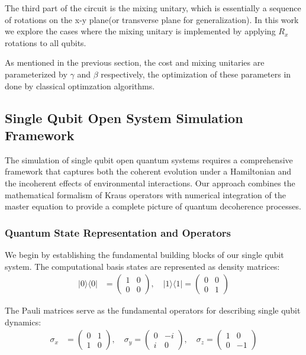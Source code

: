 \documentclass[%
 reprint,
 amsmath,amssymb,
 aps,
]{revtex4-2}
\begin{document}
The third part of the circuit is the mixing unitary, which is essentially a sequence of rotations on the x-y plane(or transverse plane for generalization). In this work we explore the cases where the mixing unitary is implemented by applying $R_x$ rotations to all qubits.

As mentioned in the previous section, the cost and mixing unitaries are parameterized by $\gamma$ and $\beta$ respectively, the optimization of these parameters in done by classical optimzation algorithms. 

\subsection{Single Qubit Open System Simulation Framework}

The simulation of single qubit open quantum systems requires a comprehensive framework that captures both the coherent evolution under a Hamiltonian and the incoherent effects of environmental interactions. Our approach combines the mathematical formalism of Kraus operators with numerical integration of the master equation to provide a complete picture of quantum decoherence processes.

\subsubsection{Quantum State Representation and Operators}

We begin by establishing the fundamental building blocks of our single qubit system. The computational basis states are represented as density matrices:
\begin{align}
|0\rangle\langle 0| &= \begin{pmatrix} 1 & 0 \\ 0 & 0 \end{pmatrix}, \quad 
|1\rangle\langle 1| = \begin{pmatrix} 0 & 0 \\ 0 & 1 \end{pmatrix}
\end{align}

The Pauli matrices serve as the fundamental operators for describing single qubit dynamics:
\begin{align}
\sigma_x &= \begin{pmatrix} 0 & 1 \\ 1 & 0 \end{pmatrix}, \quad
\sigma_y = \begin{pmatrix} 0 & -i \\ i & 0 \end{pmatrix}, \quad
\sigma_z = \begin{pmatrix} 1 & 0 \\ 0 & -1 \end{pmatrix}
\end{align}
\end{document}
